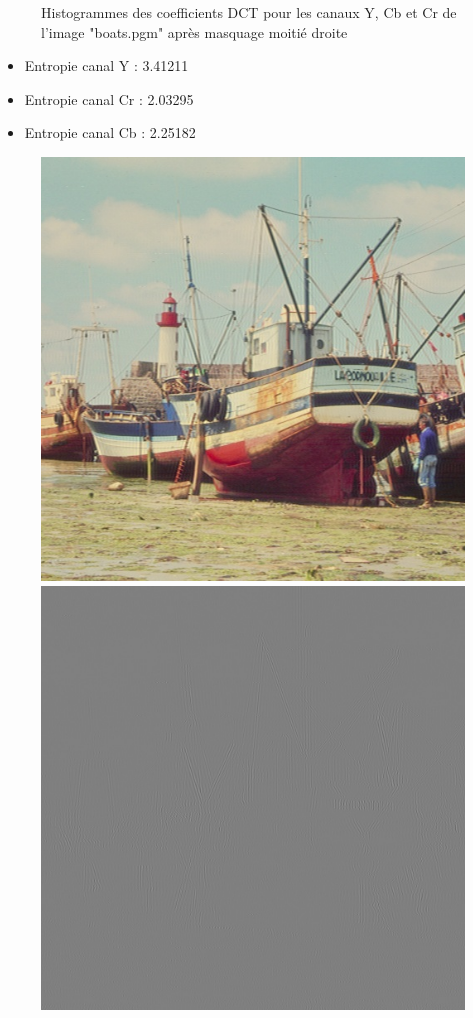 \documentclass[12pt]{report}
\begin{document}
\begin{figure}[H]
\begin{center}
\caption{Histogrammes des coefficients DCT pour les canaux Y, Cb et Cr de l'image "boats.pgm" après masquage moitié droite}
\end{center}
\end{figure}

\begin{itemize}
\item Entropie canal Y : 3.41211
\item Entropie canal Cr : 2.03295
\item Entropie canal Cb : 2.25182
\end{itemize}

\begin{figure}[H]
\begin{center}
\includegraphics[scale=0.4]{../ImageRes/idct_masked1_result.jpg} 
\includegraphics[scale=0.4]{../ImageRes/idct_masked1_disto.jpg} 

\end{center}
\end{figure}
\end{document}
